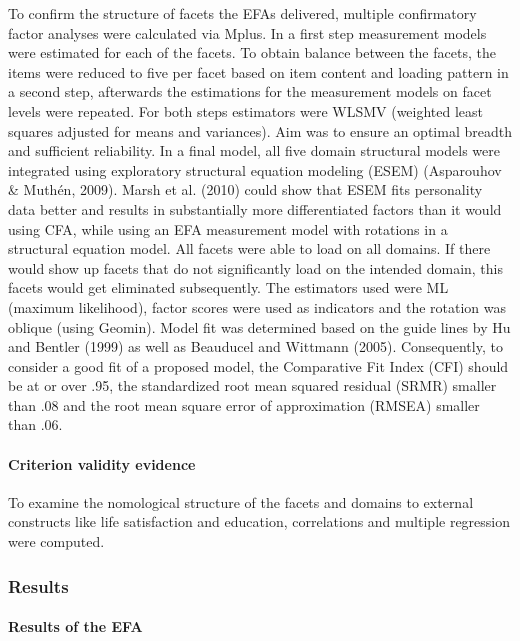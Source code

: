 \documentclass[man]{apa6}
\theoremstyle{definition}
\theoremstyle{definition}
\theoremstyle{definition}
\theoremstyle{remark}
\begin{document}
To confirm the structure of facets the EFAs delivered, multiple
confirmatory factor analyses were calculated via Mplus. In a first step
measurement models were estimated for each of the facets. To obtain
balance between the facets, the items were reduced to five per facet
based on item content and loading pattern in a second step, afterwards
the estimations for the measurement models on facet levels were
repeated. For both steps estimators were WLSMV (weighted least squares
adjusted for means and variances). Aim was to ensure an optimal breadth
and sufficient reliability. In a final model, all five domain structural
models were integrated using exploratory structural equation modeling
(ESEM) (Asparouhov \& Muthén, 2009). Marsh et al. (2010) could show that
ESEM fits personality data better and results in substantially more
differentiated factors than it would using CFA, while using an EFA
measurement model with rotations in a structural equation model. All
facets were able to load on all domains. If there would show up facets
that do not significantly load on the intended domain, this facets would
get eliminated subsequently. The estimators used were ML (maximum
likelihood), factor scores were used as indicators and the rotation was
oblique (using Geomin). Model fit was determined based on the guide
lines by Hu and Bentler (1999) as well as Beauducel and Wittmann (2005).
Consequently, to consider a good fit of a proposed model, the
Comparative Fit Index (CFI) should be at or over .95, the standardized
root mean squared residual (SRMR) smaller than .08 and the root mean
square error of approximation (RMSEA) smaller than .06.

\hypertarget{criterion-validity-evidence}{%
\paragraph{Criterion validity
evidence}\label{criterion-validity-evidence}}

To examine the nomological structure of the facets and domains to
external constructs like life satisfaction and education, correlations
and multiple regression were computed.

\hypertarget{results}{%
\subsubsection{Results}\label{results}}

\hypertarget{results-of-the-efa}{%
\paragraph{Results of the EFA}\label{results-of-the-efa}}
\end{document}
